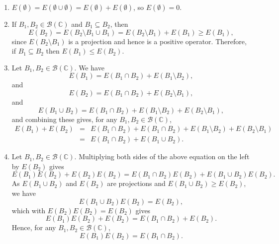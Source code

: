 \documentclass{article}
\begin{document}
\begin{enumerate}
\item $E(\emptyset)=E(\emptyset \cup \emptyset)=E(\emptyset)+E(\emptyset)$, so $E(\emptyset)=0$.

\item  If $B_1,B_2 \in \mathscr{B}(\mathbb{C})$ and $B_1 \subseteq B_2$, then
\[
E(B_2)=E(B_2 \setminus B_1 \cup B_1)=E(B_2 \setminus B_1)+E(B_1) \geq E(B_1),
\]
since $E(B_2 \setminus B_1)$ is a projection and hence is a positive operator. Therefore, if $B_1 \subseteq B_2$ then
$E(B_1) \leq E(B_2)$. 

\item Let $B_1, B_2 \in \mathscr{B}(\mathbb{C})$. We have
\[
E(B_1)=E(B_1 \cap B_2)+E(B_1 \setminus B_2),
\]
and
\[
E(B_2)=E(B_1 \cap B_2)+E(B_2 \setminus B_1),
\]
and
\[
E(B_1 \cup B_2)=E(B_1 \cap B_2) + E(B_1 \setminus B_2) + E(B_2 \setminus B_1), 
\]
and combining these gives, for any $B_1, B_2 \in \mathscr{B}(\mathbb{C})$,
\begin{eqnarray*}
E(B_1)+E(B_2)&=&E(B_1 \cap B_2)+E(B_1 \cap B_2)+E(B_1 \setminus B_2)+E(B_2 \setminus B_1)\\
&=&E(B_1 \cap B_2)+E(B_1 \cup B_2).
\end{eqnarray*}

\item Let $B_1,B_2 \in \mathscr{B}(\mathbb{C})$. Multiplying both sides of the above equation on the left by $E(B_2)$ gives
\[
E(B_1)E(B_2)+E(B_2)E(B_2)=E(B_1 \cap B_2)E(B_2)+E(B_1 \cup B_2) E(B_2).
\]
As $E(B_1 \cup B_2)$ and $E(B_2)$ are projections and $E(B_1 \cup B_2) \geq E(B_2)$, we have
\[
E(B_1 \cup B_2) E(B_2)=E(B_2),
\]
which with $E(B_2)E(B_2)=E(B_2)$ gives
\[
E(B_1)E(B_2)+E(B_2)=E(B_1 \cap B_2)+E(B_2).
\]
Hence, for any $B_1, B_2 \in \mathscr{B}(\mathbb{C})$,
\[
E(B_1)E(B_2)=E(B_1 \cap B_2).
\]
\end{enumerate}
\end{document}
